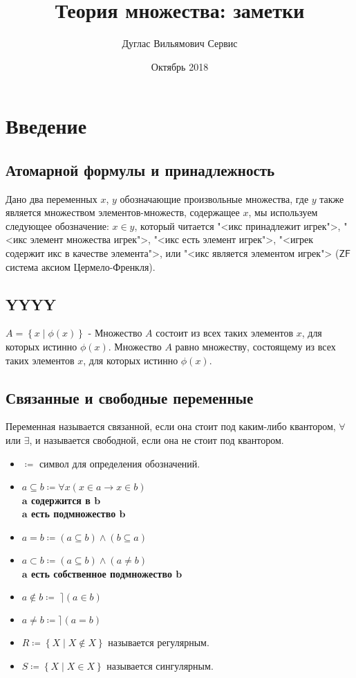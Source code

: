 \documentclass[fleqn,11pt]{article}
\theoremstyle{definition}
\begin{document}
\title{Теория множества: заметки}
\author{Дуглас Вильямович Сервис}
\date{Октябрь 2018}
\maketitle

\section{Введение}

\subsection{Атомарной формулы и принадлежность}
Дано два переменных $x$, $y$ обозначающие произвольные множества, где $y$ также является
множеством элементов-множеств, содержащее $x$, мы используем следующее обозначение:
$x \in y$, который читается "<икс принадлежит игрек">, "<икс элемент множества игрек">,
"<икс есть элемент игрек">, "<игрек содержит икс в качестве элемента">, или "<икс является элементом игрек">
($\mathsf{ZF}$ система аксиом Цермело-Френкля).

\subsection{YYYY}
$A = \left\{x  \mid \phi(x) \right\}$ - Множество $A$ состоит из всех таких элементов $x$, для
которых истинно $\phi(x)$. Множество $A$ равно множеству, состоящему из всех таких элементов $x$, для которых истинно $\phi(x)$.

\subsection{Связанные и свободные переменные}
Переменная называется связанной, если она стоит под каким-либо квантором, $\forall$ или $\exists$,
и называется свободной, если она не стоит под квантором.

\begin{itemize}
    \item $\coloneqq$ символ для определения обозначений.
    \item $a \subseteq b \coloneqq \forall x (x \in a \rightarrow x \in b)$~\\
    	\textbf{$\mathbf{a}$ содержится в $\mathbf{b}$} ~\\
    	\textbf{$\mathbf{a}$ есть подмножество $\mathbf{b}$}
    \item $a = b \coloneqq (a \subseteq b) \land (b \subseteq a)$
    \item $a \subset b \coloneqq (a \subseteq b) \land (a \neq b)$ ~\\
    	\textbf{$\mathbf{a}$ есть собственное подмножество $\mathbf{b}$}
    \item $a \notin b \coloneqq \; \rceil(a \in b)$
    \item $a \neq b \coloneqq \rceil(a = b)$
    \item $R \coloneqq \left\{X \mid X \notin X \right\}$ называется регулярным.
    \item $S \coloneqq \left\{X \mid X \in X \right\}$ называется сингулярным.
\end{itemize}
\end{document}

